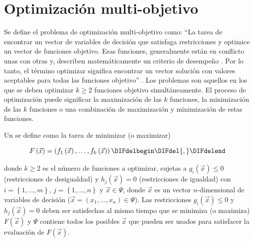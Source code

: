 \section{Optimizaci\'on multi-objetivo}

      Se define el problema de optimizaci\'on multi-objetivo como: ``La tarea de encontrar un vector de variables 
      de decisi\'on que satisfaga restricciones y optimice un vector de funciones objetivo. Esas funciones, generalmente est\'an
      en conflicto unas con otras y, describen matem\'aticamente un criterio de desempe\~no . Por lo tanto, el t\'ermino 
      optimizar significa encontrar un vector soluci\'on con valores aceptables para todas las funciones objetivo'' \cite{EASMC85}. 
      Los problemas \DIFdelbegin {}\DIFdelend \DIFaddbegin {}\DIFaddend son aquellos en los que se deben optimizar $k \geq 2$ funciones objetivo simult\'aneamente. 
      El proceso de optimizaci\'on puede significar la maximizaci\'on de las $k$ funciones, la minimizaci\'on de las $k$ 
      funciones o una combinaci\'on de maximizaci\'on y minimizaci\'on de estas funciones.

      \begin{definicion}
	  Un \DIFdelbegin {}\DIFdelend \DIFaddbegin {}\DIFaddend se define como la tarea de minimizar (o maximizar) 

	  \[F\left(\vec{x}\right)=\left(f_1\left(\vec{x}\right), \ldots,f_k\left(\vec{x}\right) \right)\DIFdelbegin \DIFdel{,}\DIFdelend \]

	  \DIFdelbegin %

\DIFdelend donde $k\geq 2$ es el n\'umero de funciones a optimizar, sujetas a $g_i\left(\vec{x}\right) \leq 0 $ (restricciones de 
	  desigualdad) y $h_j\left(\vec{x}\right) = 0 $ (restricciones de igualdad) con $i = \left\{1, \ldots, m \right\}$, $j = \left\{1, \ldots, n \right\}$ 
	  y $\vec{x} \in \Psi $, donde $\vec{x}$ es un vector $n$-dimensional de variables de decisi\'on ($\vec{x} = \left(x_1 , \ldots, x_n \right) \in \Psi$). 
	  Las restricciones $g_i\left(\vec{x}\right) \leq 0$ y $h_j\left(\vec{x}\right) = 0$ deben ser satisfechas 
	  al mismo tiempo que se minimiza (o maximiza) $F\left(\vec{x}\right)$ y $\Psi $ contiene todos los posibles 
	  $\vec{x}$ que pueden ser usados para satisfacer la evaluaci\'on de $F\left(\vec{x}\right)$.
\DIFdelbegin %
\DIFdelend \DIFaddbegin 

      \DIFaddend \end{definicion}

